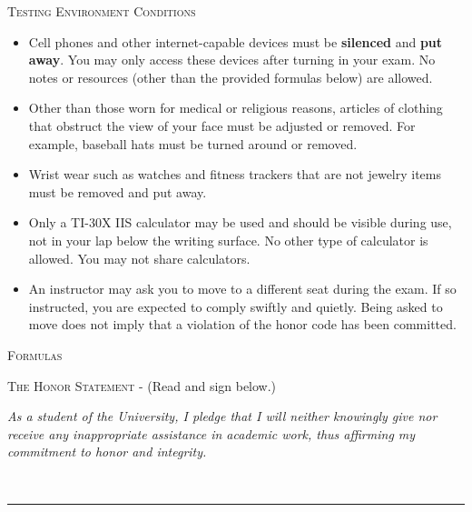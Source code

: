 \noindent \textsc{Testing Environment Conditions}
\begin{small}
\begin{itemize}
\item Cell phones and other internet-capable devices must be \textbf{silenced} and \textbf{put away}. You may only access these devices after turning in your exam. No notes or resources (other than the provided formulas below) are allowed.
\item Other than those worn for medical or religious reasons, articles of clothing that obstruct the view of your face must be adjusted or removed. For example, baseball hats must be turned around or removed.
\item Wrist wear such as watches and fitness trackers that are not jewelry items must be removed and put away.
\item Only a TI-30X IIS calculator may be used and should be visible during use, not in your lap below the writing surface. No other type of calculator is allowed. You may not share calculators.
\item An instructor may ask you to move to a different seat during the exam. If so instructed, you are expected to comply swiftly and quietly. Being asked to move does not imply that a violation of the honor code has been committed.\\
\end{itemize}
\end{small}

\noindent \textsc{Formulas}

\AllFormulas %

\vfill

\noindent \textsc{The Honor Statement} - (Read and sign below.)\\
\begin{footnotesize}
\textit{As a student of the University, I pledge that I will neither knowingly give nor receive any inappropriate assistance in academic work, thus affirming my commitment to honor and integrity.}\\
\end{footnotesize}

 \ \rule{8.75 cm}{.01cm}\\
